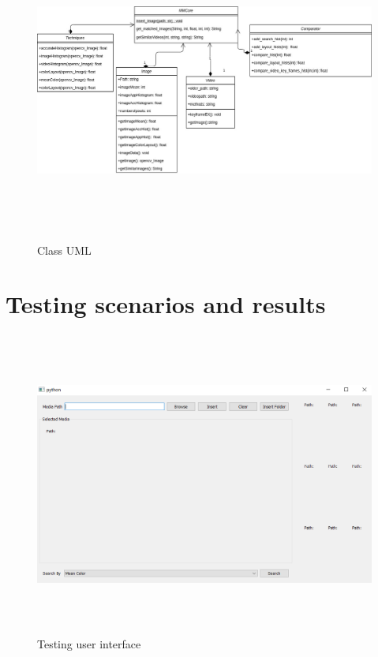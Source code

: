 \begin{figure}[H]
    \centering
    \includegraphics[width=135mm,height=100mm]{Images/system_design.jpg}
    \caption{Class  UML}
  \end{figure}



\section{Testing scenarios and results}
\begin{figure}[H]
    \centering
    \includegraphics[width=120mm,height=100mm]{Images/1.png}
    \caption{Testing user interface}
  \end{figure}

